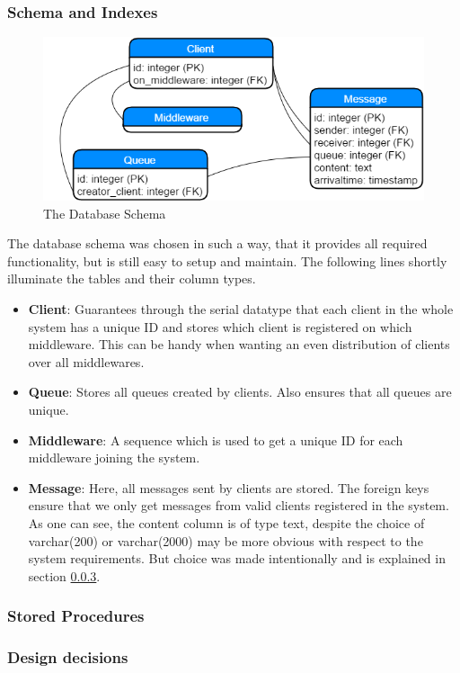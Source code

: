 \documentclass[11pt]{article}
\begin{document}
\subsubsection{Schema and Indexes}\label{sec:schema-and-indexes}
\begin{figure}[!ht]
\centering
\includegraphics[width=0.7\linewidth]{figures/database/db_schema}
\caption{The Database Schema}
\label{fig:db_schema}
\end{figure}
The database schema was chosen in such a way, that it provides all required functionality, but is still easy to setup and maintain. The following lines shortly illuminate the tables and their column types.
\begin{itemize}
	\item \textbf{Client}: Guarantees through the serial datatype that each client in the whole system has a unique ID and stores which client is registered on which middleware. This can be handy when wanting an even distribution of clients over all middlewares.
	\item \textbf{Queue}: Stores all queues created by clients. Also ensures that all queues are unique.
	\item \textbf{Middleware}: A sequence which is used to get a unique ID for each middleware joining the system.
	\item \textbf{Message}: Here, all messages sent by clients are stored. The foreign keys ensure that we only get messages from valid clients registered in the system. As one can see, the content column is of type text, despite the choice of varchar(200) or varchar(2000) may be more obvious with respect to the system requirements. But choice was made intentionally and is explained in section \ref{sec:design-decisions}.
\end{itemize}
\subsubsection{Stored Procedures}\label{sec:stored-procedures}

\subsubsection{Design decisions}\label{sec:design-decisions}
\end{document}
